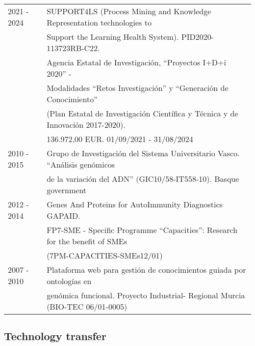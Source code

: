 \documentclass[11pt,fullpage]{article}
\begin{document}
\begin{tabular}{ll}
  2021 - 2024 & SUPPORT4LS (Process Mining and Knowledge Representation technologies to \\ 
              & Support the Learning Health System). PID2020-113723RB-C22. \\ 
              & Agencia Estatal de Investigación, ``Proyectos I+D+i 2020'' - \\ 
              & Modalidades ``Retos Investigación'' y ``Generación de Conocimiento'' \\ 
              & (Plan Estatal de Investigación Científica y Técnica y de Innovación 2017-2020). \\
              & 136.972,00 EUR. 01/09/2021 - 31/08/2024 \\
  2010 - 2015 & Grupo de Investigación del Sistema Universitario Vasco. ``Análisis genómicos \\  
              & de la variación del ADN'' (GIC10/58-IT558-10). Basque government \\
  2012 - 2014 & Genes And Proteins for AutoImmunity Diagnostics GAPAID. \\ 
              & FP7-SME - Specific Programme ``Capacities'': Research for the benefit of SMEs \\ 
              & (7PM-CAPACITIES-SMEs12/01) \\
  2007 - 2010 & Plataforma web para gesti\'on de conocimientos guiada por ontolog\'ias en \\ 
              & gen\'omica funcional. Proyecto Industrial- Regional Murcia (BIO-TEC 06/01-0005) 
\end{tabular}

\subsection*{Technology transfer}
\end{document}
